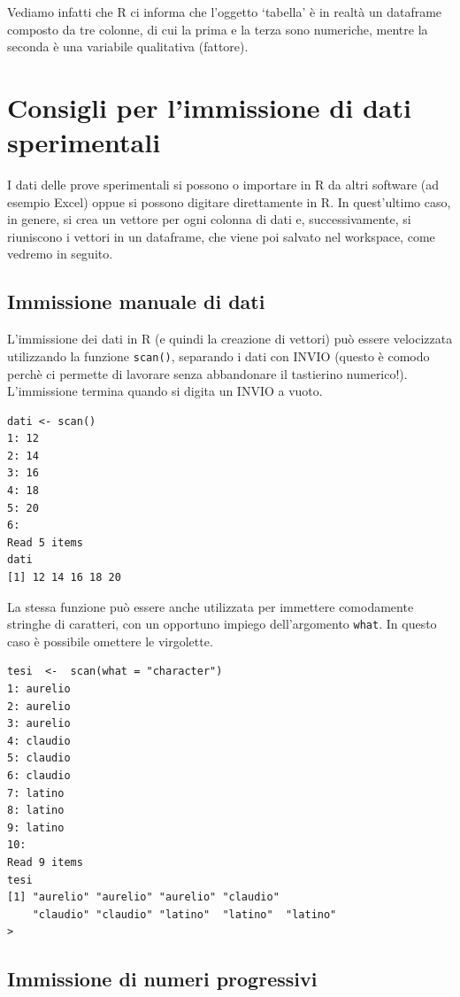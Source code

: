 \documentclass[a4paper,12pt,oneside]{book}
\theoremstyle{definition}
\theoremstyle{definition}
\theoremstyle{definition}
\theoremstyle{remark}
\begin{document}
Vediamo infatti che R ci informa che l'oggetto `tabella' è in realtà un
dataframe composto da tre colonne, di cui la prima e la terza sono
numeriche, mentre la seconda è una variabile qualitativa (fattore).

\section*{Consigli per l'immissione di dati
sperimentali}\label{consigli-per-limmissione-di-dati-sperimentali}

I dati delle prove sperimentali si possono o importare in R da altri
software (ad esempio Excel) oppue si possono digitare direttamente in R.
In quest'ultimo caso, in genere, si crea un vettore per ogni colonna di
dati e, successivamente, si riuniscono i vettori in un dataframe, che
viene poi salvato nel workspace, come vedremo in seguito.

\subsection*{Immissione manuale di
dati}\label{immissione-manuale-di-dati}

L'immissione dei dati in R (e quindi la creazione di vettori) può essere
velocizzata utilizzando la funzione \texttt{scan()}, separando i dati
con INVIO (questo è comodo perchè ci permette di lavorare senza
abbandonare il tastierino numerico!). L'immissione termina quando si
digita un INVIO a vuoto.

\begin{verbatim}
dati <- scan()
1: 12
2: 14
3: 16
4: 18
5: 20
6:
Read 5 items
dati
[1] 12 14 16 18 20
\end{verbatim}

La stessa funzione può essere anche utilizzata per immettere comodamente
stringhe di caratteri, con un opportuno impiego dell'argomento
\texttt{what}. In questo caso è possibile omettere le virgolette.

\begin{verbatim}
tesi  <-  scan(what = "character")
1: aurelio
2: aurelio
3: aurelio
4: claudio
5: claudio
6: claudio
7: latino
8: latino
9: latino
10: 
Read 9 items
tesi
[1] "aurelio" "aurelio" "aurelio" "claudio" 
    "claudio" "claudio" "latino"  "latino"  "latino" 
>
\end{verbatim}

\subsection*{Immissione di numeri
progressivi}\label{immissione-di-numeri-progressivi}
\end{document}
